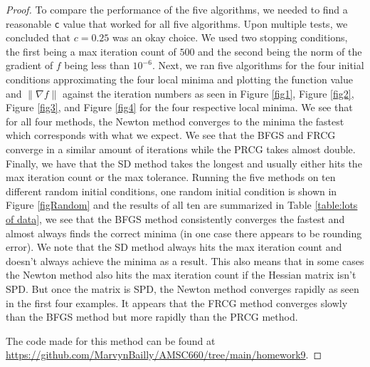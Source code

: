 \documentclass[12pt]{report}
\begin{document}
\begin{problem}
\begin{proof}
        To compare the performance of the five algorithms, we needed to find a reasonable \verb+c+ value that worked for all five algorithms. Upon multiple tests, we concluded that $c = 0.25$ was an okay choice. We used two stopping conditions, the first being a max iteration count of $500$ and the second being the norm of the gradient of $f$ being less than $10^{-6}$. Next, we ran five algorithms for the four initial conditions approximating the four local minima and plotting the function value and $\|\nabla f\|$ against the iteration numbers as seen in Figure \ref{fig1}, Figure \ref{fig2}, Figure \ref{fig3}, and Figure \ref{fig4} for the four respective local minima. We see that for all four methods, the Newton method converges to the minima the fastest which corresponds with what we expect. We see that the BFGS and FRCG converge in a similar amount of iterations while the PRCG takes almost double. Finally, we have that the SD method takes the longest and usually either hits the max iteration count or the max tolerance. Running the five methods on ten different random initial conditions, one random initial condition is shown in Figure \ref{figRandom} and the results of all ten are summarized in Table \ref{table:lots of data}, we see that the BFGS method consistently converges the fastest and almost always finds the correct minima (in one case there appears to be rounding error). We note that the SD method always hits the max iteration count and doesn't always achieve the minima as a result. This also means that in some cases the Newton method also hits the max iteration count if the Hessian matrix isn't SPD. But once the matrix is SPD, the Newton method converges rapidly as seen in the first four examples. It appears that the FRCG method converges slowly than the BFGS method but more rapidly than the PRCG method.

        The code made for this method can be found at \url{https://github.com/MarvynBailly/AMSC660/tree/main/homework9}.
\end{proof}
\end{problem}

\end{document}
